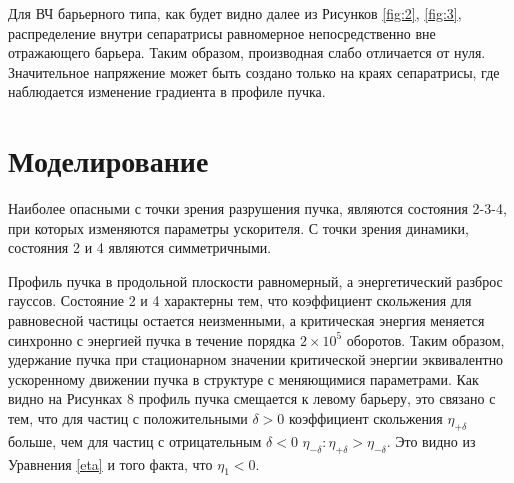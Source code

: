 \documentclass[a4paper]{panl}
\begin{document}
\par Для ВЧ барьерного типа, как будет видно далее из Рисунков \ref{fig:2}, \ref{fig:3}, распределение внутри сепаратрисы равномерное непосредственно вне от\-ра\-жа\-ющего барьера. Таким образом, производная слабо отличается от нуля. Значительное напряжение может быть создано только на кра\-ях сепаратрисы, где наблюдается изменение градиента в профиле пучка.

\label{sec:tracking}
\section*{Моделирование}

\par Наиболее опасными с точки зрения разрушения пучка, являются со\-сто\-я\-ния 2-3-4, при которых изменяются параметры ускорителя. С точки зрения динамики, состояния 2 и 4 являются симметричными.
\par Профиль пучка в продольной плоскости равномерный, а э\-нер\-ге\-ти\-чес\-кий разброс гауссов. Состояние 2 и 4 характерны тем, что коэффициент скольжения для равновесной частицы остается неизменными, а кри\-ти\-чес\-кая энергия меняется синхронно с энергией пучка в течение порядка $2\times{10}^5$ оборотов. Таким образом, удержание пучка при стационарном значении критической энергии эквивалентно ускоренному движении пуч\-ка в структуре с меняющимися параметрами. Как видно на Рисунках 8 профиль пучка смещается к левому барьеру, это связано с тем, что для частиц с положительными $\delta>0$ коэффициент скольжения $\eta_{+\delta}$ больше, чем для частиц с отрицательным $\delta<0$ $\eta_{-\delta}: \eta_{+\delta}>\eta_{-\delta}$. Это видно из Уравнения \ref{eta} и того факта, что $\eta_1<0$. 
\end{document}
